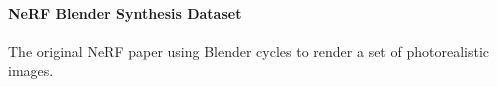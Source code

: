 \paragraph{NeRF Blender Synthesis Dataset}

The original NeRF paper using Blender cycles to render a set of photorealistic images.

